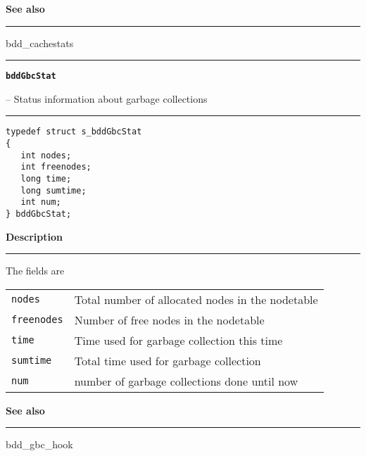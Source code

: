\begin{minipage}{\textwidth}
\vspace{\parsep}\vspace{\baselineskip}\noindent
{\bf See also}\\\rule[1.5ex]{\textwidth}{0.2mm}\vspace{-1.5ex}
bdd\_cachestats 
\end{minipage}
\vspace{8ex}
\begin{minipage}{\textwidth}

\noindent\begin{minipage}{\textwidth}
\rule{\textwidth}{0.5mm}
{\tt\bf bddGbcStat }
\--- Status information about garbage collections  \hspace{\fill}
\\\rule[1.5ex]{\textwidth}{0.5mm}
\end{minipage}

\noindent\begin{verbatim}
typedef struct s_bddGbcStat
{
   int nodes;
   int freenodes;
   long time;
   long sumtime;
   int num;
} bddGbcStat;  
\end{verbatim}

\vspace{\parsep}\noindent
{\bf Description}\\\rule[1.5ex]{\textwidth}{0.2mm}\vspace{-1.5ex}\setlength{\parindent}{1em}
The fields are \\[\baselineskip] \begin{tabular}{ll}
  {\tt nodes}     & Total number of allocated nodes in the nodetable \\
  {\tt freenodes} & Number of free nodes in the nodetable \\
  {\tt time}      & Time used for garbage collection this time \\
  {\tt sumtime}   & Total time used for garbage collection \\
  {\tt num}       & number of garbage collections done until now
  \end{tabular} 

\vspace{\parsep}\vspace{\baselineskip}\noindent
{\bf See also}\\\rule[1.5ex]{\textwidth}{0.2mm}\vspace{-1.5ex}
bdd\_gbc\_hook 
\end{minipage}
\vspace{8ex}
